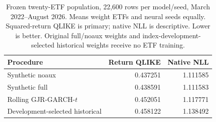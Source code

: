 \begin{table}[!htbp]\centering\small
\caption[Frozen external ETF scores]{Frozen twenty-ETF population, 22,600 rows per model/seed, March 2022--August 2026. Means weight ETFs and neural seeds equally. Squared-return QLIKE is primary; native NLL is descriptive. Lower is better. Original full/noaux weights and index-development-selected historical weights receive no ETF training.}
\label{tab:followup-etfs}
\begin{tabular}{lrr}
\toprule
Procedure & Return QLIKE & Native NLL \\
\midrule
Synthetic noaux & 0.437251 & 1.111585 \\
Synthetic full & 0.438591 & 1.111583 \\
Rolling GJR-GARCH-$t$ & 0.452051 & 1.117771 \\
Development-selected historical & 0.458122 & 1.138492 \\
\bottomrule\end{tabular}
\end{table}

